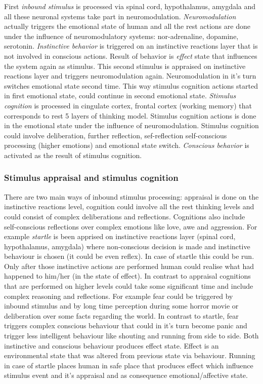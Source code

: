First \emph{inbound stimulus} is processed via spinal cord, hypothalamus, amygdala and all these neuronal systems take part in neuromodulation. 
\emph{Neuromodulation} actually triggers the emotional state of human and all the rest actions are done under the influence of neuromodulatory systems: nor-adrenaline, dopamine, serotonin. 
\emph{Instinctive behavior} is triggered on an instinctive reactions layer that is not involved in conscious actions. 
Result of behavior is \emph{effect} state that influences the system again as stimulus. This second stimulus is appraised on instinctive reactions layer and triggers neuromodulation again. Neuromodulation in it's turn switches emotional state second time. This way stimulus cognition actions started in first emotional state, could continue in second emotional state. 
\emph{Stimulus cognition} is processed in cingulate cortex, frontal cortex (working memory) that corresponds to rest 5 layers of thinking model. Stimulus cognition actions is done in the emotional state under the influence of neuromodulation. Stimulus cognition could involve deliberation, further reflection, sef-reflection self-conscious processing (higher emotions) and  emotional state switch.
\emph{Conscious behavior} is activated as the result of stimulus cognition.

\subsubsection{Stimulus appraisal and stimulus cognition}

There are two main ways of inbound stimulus processing: appraisal is done on the instinctive reactions level, cognition could involve all the rest thinking levels and could consist of complex deliberations and reflections.
Cognitions also include self-conscious reflections over complex emotions like love, awe and aggression. For example \emph{startle} is been apprised on instinctive reactions layer (spinal cord, hypothalamus, amygdala) where non-conscious decision is made and instinctive behaviour is chosen (it could be even reflex). In case of startle this could be run. Only after those instinctive actions are performed human could realise what had happened to him/her (in the state of effect). In contrast to appraisal cognitions that are performed on higher levels could take some significant time and include complex reasoning and reflections. For example fear could be triggered by inbound stimulus and by long time perception during some horror movie or deliberation over some facts regarding the world. In contrast to startle, fear triggers complex conscious behaviour that could in it's turn become panic and trigger less intelligent behaviour like shouting and running from side to side. Both instinctive and conscious behaviour produces effect state. Effect is an environmental state that was altered from previous state via behaviour. Running in case of startle places human in safe place that produces effect which influence stimulus event and it's appraisal and as consequence emotional/affective state.

